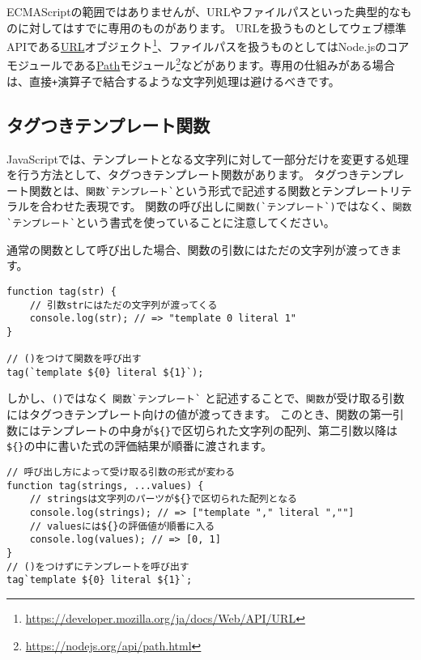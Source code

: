 ECMAScriptの範囲ではありませんが、URLやファイルパスといった典型的なものに対してはすでに専用のものがあります。
URLを扱うものとしてウェブ標準APIである\href{https://developer.mozilla.org/ja/docs/Web/API/URL}{URL}オブジェクト\footnote{\url{https://developer.mozilla.org/ja/docs/Web/API/URL}}、ファイルパスを扱うものとしてはNode.jsのコアモジュールである\href{https://nodejs.org/api/path.html}{Path}モジュール\footnote{\url{https://nodejs.org/api/path.html}}などがあります。専用の仕組みがある場合は、直接\texttt{+}演算子で結合するような文字列処理は避けるべきです。

\hypertarget{tagged-template-function}{%
\subsection[タグつきテンプレート関数]{タグつきテンプレート関数\,\protect{}}\label{tagged-template-function}}

JavaScriptでは、テンプレートとなる文字列に対して一部分だけを変更する処理を行う方法として、タグつきテンプレート関数があります。
タグつきテンプレート関数とは、\texttt{関数}\lstinline{`}\texttt{テンプレート}\lstinline{`}という形式で記述する関数とテンプレートリテラルを合わせた表現です。
関数の呼び出しに\texttt{関数}\lstinline{(`}\texttt{テンプレート}\lstinline{`)}ではなく、\texttt{関数}\lstinline{`}\texttt{テンプレート}\lstinline{`}という書式を使っていることに注意してください。

通常の関数として呼び出した場合、関数の引数にはただの文字列が渡ってきます。

\begin{lstlisting}
function tag(str) {
    // 引数strにはただの文字列が渡ってくる
    console.log(str); // => "template 0 literal 1"
}

// ()をつけて関数を呼び出す
tag(`template ${0} literal ${1}`);
\end{lstlisting}

しかし、\texttt{()}ではなく
\texttt{関数}\lstinline{`}\texttt{テンプレート}\lstinline{`}
と記述することで、\texttt{関数}が受け取る引数にはタグつきテンプレート向けの値が渡ってきます。
このとき、関数の第一引数にはテンプレートの中身が\texttt{\$\{\}}で区切られた文字列の配列、第二引数以降は\texttt{\$\{\}}の中に書いた式の評価結果が順番に渡されます。

\begin{lstlisting}
// 呼び出し方によって受け取る引数の形式が変わる
function tag(strings, ...values) {
    // stringsは文字列のパーツが${}で区切られた配列となる
    console.log(strings); // => ["template "," literal ",""]
    // valuesには${}の評価値が順番に入る
    console.log(values); // => [0, 1]
}
// ()をつけずにテンプレートを呼び出す
tag`template ${0} literal ${1}`;
\end{lstlisting}


